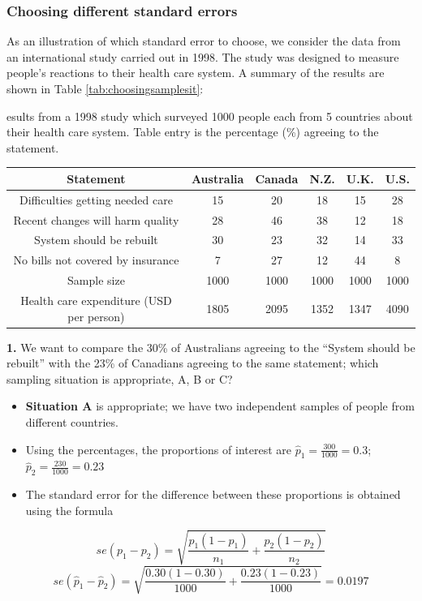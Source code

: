 \documentclass[
  oneside]{krantz}
\begin{document}
\hypertarget{choosing-different-standard-errors}{%
\subsubsection{Choosing different standard errors}\label{choosing-different-standard-errors}}

As an illustration of which standard error to choose, we consider the data from an international study carried out in 1998. The study was designed to measure people's reactions to their health care system. A summary of the results are shown in Table \ref{tab:choosingsamplesit}:

\label{tab:choosingsamplesit} esults from a 1998 study which surveyed 1000 people each from 5 countries
about their health care system. Table entry is the percentage (\%) agreeing to the statement.

\begin{longtable}[]{@{}cccccc@{}}
\toprule
Statement & Australia & Canada & N.Z. & U.K. & U.S.\tabularnewline
\midrule
\endhead
Difficulties getting needed care & 15 & 20 & 18 & 15 & 28\tabularnewline
Recent changes will harm quality & 28 & 46 & 38 & 12 & 18\tabularnewline
System should be rebuilt & 30 & 23 & 32 & 14 & 33\tabularnewline
No bills not covered by insurance & 7 & 27 & 12 & 44 & 8\tabularnewline
Sample size & 1000 & 1000 & 1000 & 1000 & 1000\tabularnewline
Health care expenditure (USD per person) & 1805 & 2095 & 1352 & 1347 & 4090\tabularnewline
\bottomrule
\end{longtable}

\textbf{1.} We want to compare the 30\% of Australians agreeing to the ``System should be rebuilt'' with the 23\% of Canadians agreeing to the same statement; which sampling situation is appropriate, A, B or C?

\begin{itemize}
\item
  \textbf{Situation A} is appropriate; we have two independent samples of people from different countries.
\item
  Using the percentages, the proportions of interest are \(\hat p_1 = \frac{300}{1000} = 0.3\); \(\hat p_2 = \frac{230}{1000} = 0.23\)
\item
  The standard error for the difference between these proportions is obtained using the formula
\end{itemize}

\[se(p_1-p_2) = \sqrt{\frac{p_1(1-p_1)}{n_1}+\frac{p_2(1-p_2)}{n_2}}\]
\[se(\hat p_1-\hat p_2) = \sqrt{\frac{0.30(1-0.30)}{1000}+\frac{0.23(1-0.23)}{1000}}=0.0197\]
\end{document}
